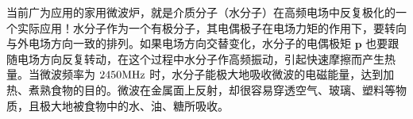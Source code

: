 当前广为应用的家用微波炉，就是介质分子（水分子）在高频电场中反复极化的一个实际应用！水分子作为一个有极分子，其电偶极子在电场力矩的作用下，要转向与外电场方向一致的排列。如果电场方向交替变化，水分子的电偶极矩 $\mathbf p$ 也要跟随电场方向反复转动，在这个过程中水分子作高频振动，引起快速摩擦而产生热量。当微波频率为 $2450\rm  MHz$ 时，水分子能极大地吸收微波的电磁能量，达到加热、煮熟食物的目的。微波在金属面上反射，却很容易穿透空气、玻璃、塑料等物质，且极大地被食物中的水、油、糖所吸收。

